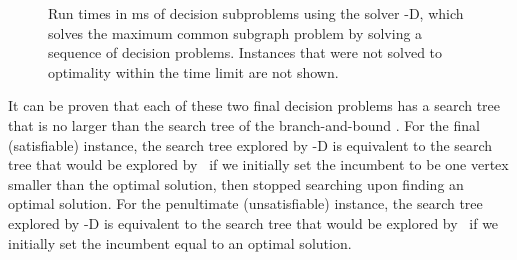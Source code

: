 \begin{figure}[h!]
    \centering
    \caption{Run times in ms of decision subproblems using the solver \McSplit-D, which solves
        the maximum common subgraph problem by solving a sequence of decision problems.  Instances
        that were not solved to optimality within the time limit are not shown.}\label{figure:decision-problem-time-scatters}
\end{figure}

It can be proven that each of these two final decision problems has a search tree that is no larger
than the search tree of the branch-and-bound \McSplit.  For the final (satisfiable)
instance, the search tree explored by \McSplit-D is equivalent
to the search tree that would be explored by \McSplit\ if we initially set the incumbent
to be one vertex smaller than the optimal solution, then stopped searching upon finding
an optimal solution.  For the penultimate (unsatisfiable) instance, the search
tree explored by \McSplit-D is equivalent to the search tree that would be explored by
\McSplit\ if we initially set the incumbent equal to an optimal solution.

